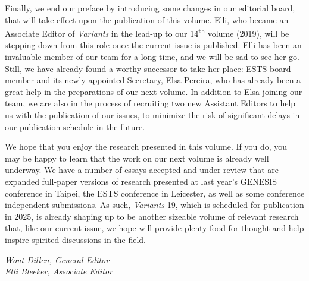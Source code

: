\begin{preface}
Finally, we end our preface by introducing some changes in our editorial board, that will take effect upon the publication of this volume. Elli, who became an Associate Editor of \textit{Variants} in the lead-up to our 14\textsuperscript{th} volume (2019), will be stepping down from this role once the current issue is published. Elli has been an invaluable member of our team for a long time, and we will be sad to see her go. Still, we have already found a worthy successor to take her place: ESTS board member and its newly appointed Secretary, Elsa Pereira, who has already been a great help in the preparations of our next volume. In addition to Elsa joining our team, we are also in the process of recruiting two new Assistant Editors to help us with the publication of our issues, to minimize the risk of significant delays in our publication schedule in the future. 

We hope that you enjoy the research presented in this volume. If you do, you may be happy to learn that the work on our next volume is already well underway. We have a number of essays accepted and under review that are expanded full-paper versions of research presented at last year's GENESIS conference in Taipei, the ESTS conference in Leicester, as well as some conference independent submissions. As such, \textit{Variants} 19, which is scheduled for publication in 2025, is already shaping up to be another sizeable volume of relevant research that, like our current issue, we hope will provide plenty food for thought and help inspire spirited discussions in the field.






\begin{flushright}
\emph{
Wout Dillen, General Editor\\
Elli Bleeker, Associate Editor
}
\end{flushright}

\end{preface}